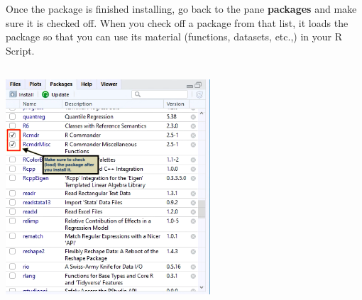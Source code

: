 \documentclass[a4paper]{report}
\begin{document}
\begin{flushleft}
        
        Once the package is finished installing, go back to the pane \textbf{packages} and make sure it is checked off. When you check off a package from that list, it loads the package so that you can use its material (functions, datasets, etc.,) in your R Script. 
        
                    \includegraphics[width=3in,height=3.5in]{images/PCK3.png}

        \end{flushleft}
\end{document}
